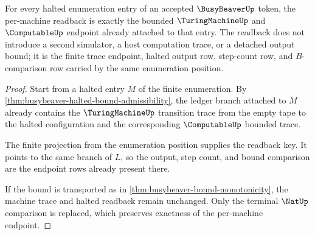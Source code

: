 \begin{theorem}
\label{thm:busybeaver-per-machine-readback-exactness}
For every halted enumeration entry of an accepted $\BusyBeaverUp$ token, the
per-machine readback is exactly the bounded $\TuringMachineUp$ and
$\ComputableUp$ endpoint already attached to that entry. The readback does not
introduce a second simulator, a host computation trace, or a detached output
bound; it is the finite trace endpoint, halted output row, step-count row, and
$B$-comparison row carried by the same enumeration position.
\end{theorem}
\begin{proof}
Start from a halted entry $M$ of the finite enumeration. By
\autoref{thm:busybeaver-halted-bound-admissibility}, the ledger branch attached
to $M$ already contains the $\TuringMachineUp$ transition trace from the empty
tape to the halted configuration and the corresponding $\ComputableUp$ bounded
trace.

The finite projection from the enumeration position supplies the readback key.
It points to the same branch of $L$, so the output, step count, and bound
comparison are the endpoint rows already present there.

If the bound is transported as in
\autoref{thm:busybeaver-bound-monotonicity}, the machine trace and halted
readback remain unchanged. Only the terminal $\NatUp$ comparison is replaced,
which preserves exactness of the per-machine endpoint.
\end{proof}

